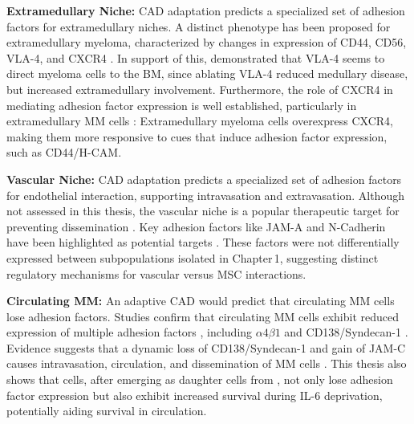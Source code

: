 \textbf{Extramedullary Niche:}
\ac{CAD} adaptation predicts a specialized set of adhesion factors for
extramedullary niches. A distinct phenotype has been proposed for extramedullary
myeloma, characterized by changes in
expression of CD44, CD56, VLA-4, and CXCR4
\cite{guptaExtramedullaryMultipleMyeloma2022}. In support of this,
\cite{hathiAblationVLA4Multiple2022} demonstrated that VLA-4 seems to direct
myeloma cells to the BM, since ablating VLA-4 reduced medullary disease, but
increased extramedullary involvement. Furthermore, the role of CXCR4 in
mediating adhesion factor expression is well established, particularly in
extramedullary MM cells \cite{roccaroCXCR4RegulatesExtraMedullary2015,
    guptaExtramedullaryMultipleMyeloma2022}: Extramedullary myeloma cells
overexpress CXCR4, making them more responsive to cues that induce adhesion
factor expression, such as CD44/H-CAM.



\textbf{Vascular Niche:}
\ac{CAD} adaptation predicts a specialized set of adhesion factors for
endothelial interaction, supporting intravasation and extravasation. Although
not assessed in this thesis, the vascular niche is a popular therapeutic target
for preventing dissemination \cite{neriTargetingAdhesionMolecules2012}. Key
adhesion factors like JAM-A and N-Cadherin have been highlighted as potential
targets \cite{solimandoHaltingViciousCycle2020,
    mrozikTherapeuticTargetingNcadherin2015}. These factors were not differentially
expressed between subpopulations isolated in Chapter\,1, suggesting distinct
regulatory mechanisms for vascular versus \ac{MSC} interactions.


\textbf{Circulating MM:}
An adaptive \ac{CAD} would predict that circulating MM cells lose adhesion
factors. Studies confirm that  circulating
\ac{MM} cells exhibit reduced expression of multiple adhesion factors
, including
$\alpha4\beta1$ and CD138/Syndecan-1
\cite{paivaDetailedCharacterizationMultiple2013,
    paivaCompetitionClonalPlasma2011, akhmetzyanovaDynamicCD138Surface2020}.
Evidence suggests that a dynamic loss of CD138/Syndecan-1 and gain of JAM-C
causes intravasation, circulation, and dissemination of MM cells
\cite{akhmetzyanovaDynamicCD138Surface2020,
    brandlJunctionalAdhesionMolecule2022}. This thesis also shows that \nMAina
cells, after emerging as daughter cells from \MAina, not only lose adhesion
factor expression but also exhibit increased survival during IL-6 deprivation,
potentially aiding survival in circulation.


